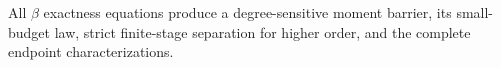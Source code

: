 All \(\beta\) exactness equations produce a degree-sensitive moment barrier, its small-budget law, strict finite-stage separation for higher order, and the complete endpoint characterizations.
